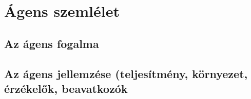 \section{Ágens szemlélet}

\subsection{Az ágens fogalma}

\subsection{Az ágens jellemzése (teljesítmény, környezet, érzékelők, beavatkozók}
